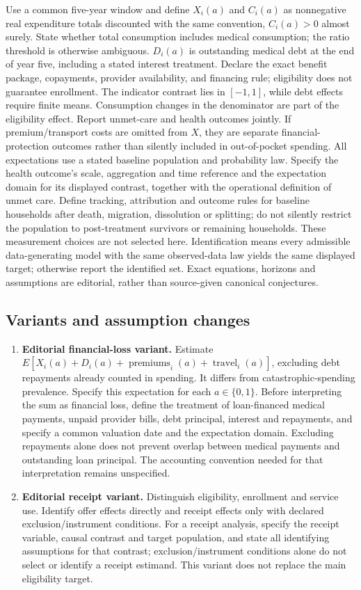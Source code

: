 \documentclass[11pt,a4paper]{article}
\begin{document}
Use a common five-year window and define \(X_i(a)\) and \(C_i(a)\) as nonnegative real expenditure totals discounted with the same convention, \(C_i(a)>0\) almost surely. State whether total consumption includes medical consumption; the ratio threshold is otherwise ambiguous. \(D_i(a)\) is outstanding medical debt at the end of year five, including a stated interest treatment. Declare the exact benefit package, copayments, provider availability, and financing rule; eligibility does not guarantee enrollment. The indicator contrast lies in \([-1,1]\), while debt effects require finite means. Consumption changes in the denominator are part of the eligibility effect. Report unmet-care and health outcomes jointly. If premium/transport costs are omitted from \(X\), they are separate financial-protection outcomes rather than silently included in out-of-pocket spending. All expectations use a stated baseline population and probability law. Specify the health outcome's scale, aggregation and time reference and the expectation domain for its displayed contrast, together with the operational definition of unmet care. Define tracking, attribution and outcome rules for baseline households after death, migration, dissolution or splitting; do not silently restrict the population to post-treatment survivors or remaining households. These measurement choices are not selected here. Identification means every admissible data-generating model with the same observed-data law yields the same displayed target; otherwise report the identified set. Exact equations, horizons and assumptions are editorial, rather than source-given canonical conjectures.
\subsection*{Variants and assumption changes}
\begin{enumerate}
\item \textbf{Editorial financial-loss variant.} Estimate \(E[X_i(a)+D_i(a)+\operatorname{premiums}_i(a)+\operatorname{travel}_i(a)]\), excluding debt repayments already counted in spending. It differs from catastrophic-spending prevalence. Specify this expectation for each \(a\in\{0,1\}\). Before interpreting the sum as financial loss, define the treatment of loan-financed medical payments, unpaid provider bills, debt principal, interest and repayments, and specify a common valuation date and the expectation domain. Excluding repayments alone does not prevent overlap between medical payments and outstanding loan principal. The accounting convention needed for that interpretation remains unspecified.
\item \textbf{Editorial receipt variant.} Distinguish eligibility, enrollment and service use. Identify offer effects directly and receipt effects only with declared exclusion/instrument conditions. For a receipt analysis, specify the receipt variable, causal contrast and target population, and state all identifying assumptions for that contrast; exclusion/instrument conditions alone do not select or identify a receipt estimand. This variant does not replace the main eligibility target.
\end{enumerate}
\end{document}
